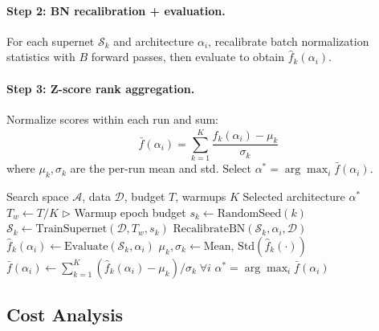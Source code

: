 \documentclass[10pt,twocolumn,letterpaper]{article}
\newcommand{\method}{SRAS}
\begin{document}
\paragraph{Step 2: BN recalibration + evaluation.} For each supernet $\mathcal{S}_k$ and architecture $\alpha_i$, recalibrate batch normalization statistics with $B$ forward passes, then evaluate to obtain $\hat{f}_k(\alpha_i)$.

\paragraph{Step 3: Z-score rank aggregation.} Normalize scores within each run and sum:
\begin{equation}
    \bar{f}(\alpha_i) = \sum_{k=1}^{K} \frac{\hat{f}_k(\alpha_i) - \mu_k}{\sigma_k}
    \label{eq:zscore}
\end{equation}
where $\mu_k, \sigma_k$ are the per-run mean and std. Select $\alpha^* = \arg\max_i \bar{f}(\alpha_i)$.

\begin{algorithm}[t]
\small
\caption{\method{}: Seed-Robust Architecture Selection}
\label{alg:sras}
\begin{algorithmic}[1]
\renewcommand{\algorithmicrequire}{\textbf{Input:}}
\renewcommand{\algorithmicensure}{\textbf{Output:}}
\REQUIRE Search space $\mathcal{A}$, data $\mathcal{D}$, budget $T$, warmups $K$
\ENSURE Selected architecture $\alpha^*$
\STATE $T_w \leftarrow T / K$ \hfill $\triangleright$ Warmup epoch budget
    \STATE $s_k \leftarrow \text{RandomSeed}(k)$
    \STATE $\mathcal{S}_k \leftarrow \text{TrainSupernet}(\mathcal{D}, T_w, s_k)$
        \STATE $\text{RecalibrateBN}(\mathcal{S}_k, \alpha_i, \mathcal{D})$
        \STATE $\hat{f}_k(\alpha_i) \leftarrow \text{Evaluate}(\mathcal{S}_k, \alpha_i)$
    \ENDFOR
    \STATE $\mu_k, \sigma_k \leftarrow \text{Mean, Std}(\hat{f}_k(\cdot))$
\ENDFOR
\STATE $\bar{f}(\alpha_i) \leftarrow \sum_{k=1}^{K} (\hat{f}_k(\alpha_i) - \mu_k) / \sigma_k \; \forall i$
\RETURN $\alpha^* = \arg\max_i \bar{f}(\alpha_i)$
\end{algorithmic}
\end{algorithm}

\subsection{Cost Analysis}
\label{sec:cost}
\end{document}
